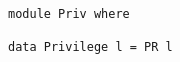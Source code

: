 \begin{Verbatim}[fontsize=\footnotesize,frame=lines,
                 framesep=5mm, label={[Priv.hs]Priv.hs}]

module Priv where

data Privilege l = PR l
\end{Verbatim}
